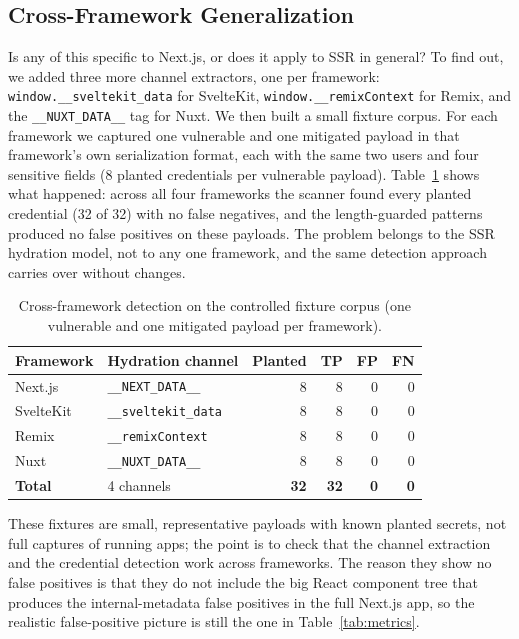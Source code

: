 \documentclass[runningheads]{llncs}
\begin{document}
\subsection{Cross-Framework Generalization}
\label{sec:crossfw}

Is any of this specific to Next.js, or does it apply to SSR in general?
To find out, we added three more channel extractors, one per framework:
\texttt{window.\_\_sveltekit\_data} for SvelteKit,
\texttt{window.\_\_remixContext} for Remix, and the
\texttt{\_\_NUXT\_DATA\_\_} tag for Nuxt.  We then built a small fixture
corpus.  For each framework we captured one vulnerable and one mitigated
payload in that framework's own serialization format, each with the same
two users and four sensitive fields (8 planted credentials per vulnerable
payload).  Table~\ref{tab:crossfw} shows what happened: across all four
frameworks the scanner found every planted credential (32 of 32) with no
false negatives, and the length-guarded patterns produced no false
positives on these payloads.  The problem belongs to the SSR hydration
model, not to any one framework, and the same detection approach carries
over without changes.

\begin{table}[tbp]
  \caption{Cross-framework detection on the controlled fixture corpus
    (one vulnerable and one mitigated payload per framework).}
  \label{tab:crossfw}
  \centering
  \begin{tabular}{llrrrr}
    \toprule
    \textbf{Framework} & \textbf{Hydration channel} & \textbf{Planted}
      & \textbf{TP} & \textbf{FP} & \textbf{FN} \\
    \midrule
    Next.js   & \texttt{\_\_NEXT\_DATA\_\_}   & 8 & 8 & 0 & 0 \\
    SvelteKit & \texttt{\_\_sveltekit\_data}  & 8 & 8 & 0 & 0 \\
    Remix     & \texttt{\_\_remixContext}     & 8 & 8 & 0 & 0 \\
    Nuxt      & \texttt{\_\_NUXT\_DATA\_\_}    & 8 & 8 & 0 & 0 \\
    \midrule
    \textbf{Total} & 4 channels & \textbf{32} & \textbf{32} & \textbf{0} & \textbf{0} \\
    \bottomrule
  \end{tabular}
\end{table}

These fixtures are small, representative payloads with known planted
secrets, not full captures of running apps; the point is to check that the
channel extraction and the credential detection work across frameworks.
The reason they show no false positives is that they do not include the
big React component tree that produces the internal-metadata false
positives in the full Next.js app, so the realistic false-positive picture
is still the one in Table~\ref{tab:metrics}.
\end{document}
